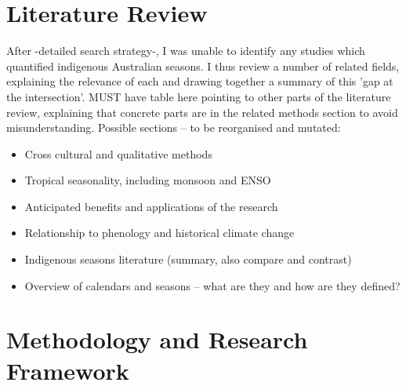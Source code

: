 


\section{Literature Review}
\label{sec:lit-review}

After -detailed search strategy-, I was unable to identify any studies which quantified indigenous Australian seasons.
I thus review a number of related fields, explaining the relevance of each and drawing together a summary of this 'gap at the intersection'.
MUST have table here pointing to other parts of the literature review, explaining that concrete parts are in the related methods section to avoid misunderstanding. 
Possible sections – to be reorganised and mutated:

\begin{itemize}
\item Cross cultural and qualitative methods
\item Tropical seasonality, including monsoon and ENSO
\item Anticipated benefits and applications of the research
\item Relationship to phenology and historical climate change
\item Indigenous seasons literature (summary, also compare and contrast)
\item Overview of calendars and seasons – what are they and how are they defined?
\end{itemize}

\section{Methodology and Research Framework}

